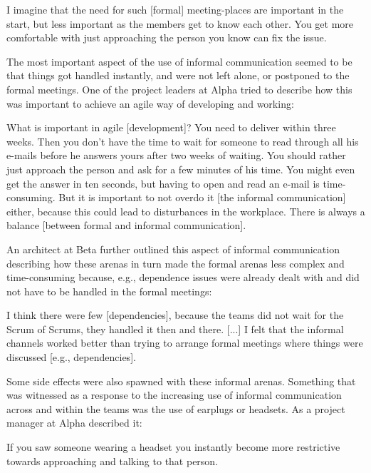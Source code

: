 \begin{fancyquotes}
I imagine that the need for such [formal] meeting-places are important in the start, but less important as the members get to know each other. You get more comfortable with just approaching the person you know can fix the issue.
\end{fancyquotes}

The most important aspect of the use of informal communication seemed to be that things got handled instantly, and were not left alone, or postponed to the formal meetings. One of the project leaders at Alpha tried to describe how this was important to achieve an agile way of developing and working:

\begin{fancyquotes}
What is important in agile [development]? You need to deliver within three weeks. Then you don't have the time to wait for someone to read through all his e-mails before he answers yours after two weeks of waiting. You should rather just approach the person and ask for a few minutes of his time. You might even get the answer in ten seconds, but having to open and read an e-mail is time-consuming. But it is important to not overdo it [the informal communication] either, because this could lead to disturbances in the workplace. There is always a balance [between formal and informal communication].
\end{fancyquotes}

An architect at Beta further outlined this aspect of informal communication describing how these arenas in turn made the formal arenas less complex and time-consuming because, e.g., dependence issues were already dealt with and did not have to be handled in the formal meetings:

\begin{fancyquotes}
I think there were few [dependencies], because the teams did not wait for the Scrum of Scrums, they handled it then and there. [...] I felt that the informal channels worked better than trying to arrange formal meetings where things were discussed [e.g., dependencies].
\end{fancyquotes}

Some side effects were also spawned with these informal arenas. Something that was witnessed as a response to the increasing use of informal communication across and within the teams was the use of earplugs or headsets. As a project manager at Alpha described it:

\begin{fancyquotes}
If you saw someone wearing a headset you instantly become more restrictive towards approaching and talking to that person.
\end{fancyquotes}

